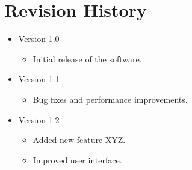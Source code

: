 
\section{Revision History}

\begin{itemize}
    \item Version 1.0
    \begin{itemize}
        \item Initial release of the software.
    \end{itemize}
    
    \item Version 1.1
    \begin{itemize}
        \item Bug fixes and performance improvements.
    \end{itemize}
    
    \item Version 1.2
    \begin{itemize}
        \item Added new feature XYZ.
        \item Improved user interface.
    \end{itemize}
\end{itemize}

